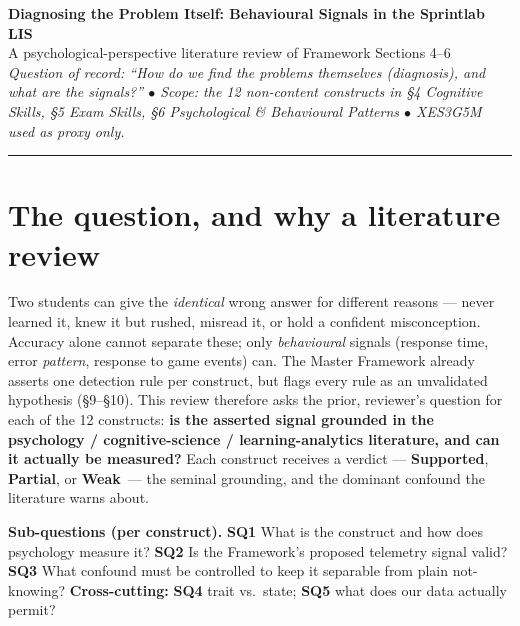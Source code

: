 \documentclass[10pt]{article}
\newcommand{\Sup}{\textbf{\color{good}Supported}}
\newcommand{\Par}{\textbf{\color{part}Partial}}
\newcommand{\Weak}{\textbf{\color{weak}Weak}}
\begin{document}
\begin{center}
{\LARGE\bfseries\color{accent} Diagnosing the Problem Itself: Behavioural Signals in the Sprintlab LIS}\\[2pt]
{\large A psychological-perspective literature review of Framework Sections 4--6}\\[3pt]
{\footnotesize\itshape Question of record: ``How do we find the problems themselves (diagnosis), and what are the signals?'' \;$\bullet$\; Scope: the 12 non-content constructs in \S4 Cognitive Skills, \S5 Exam Skills, \S6 Psychological \& Behavioural Patterns \;$\bullet$\; XES3G5M used as proxy only.}
\end{center}
\vspace{-2pt}\hrule\vspace{4pt}

\section{The question, and why a literature review}
Two students can give the \emph{identical} wrong answer for different reasons --- never learned it, knew it but rushed, misread it, or hold a confident misconception. Accuracy alone cannot separate these; only \emph{behavioural} signals (response time, error \emph{pattern}, response to game events) can. The Master Framework already asserts one detection rule per construct, but flags every rule as an unvalidated hypothesis (\S9--\S10). This review therefore asks the prior, reviewer's question for each of the 12 constructs: \textbf{is the asserted signal grounded in the psychology / cognitive-science / learning-analytics literature, and can it actually be measured?} Each construct receives a verdict --- \Sup, \Par, or \Weak\ --- the seminal grounding, and the dominant confound the literature warns about.

\textbf{Sub-questions (per construct).} \;\textbf{SQ1} What is the construct and how does psychology measure it?\; \textbf{SQ2} Is the Framework's proposed telemetry signal valid?\; \textbf{SQ3} What confound must be controlled to keep it separable from plain not-knowing? \;\;\textbf{Cross-cutting:} \textbf{SQ4} trait vs.\ state; \textbf{SQ5} what does our data actually permit?
\vspace{-1pt}
\end{document}
